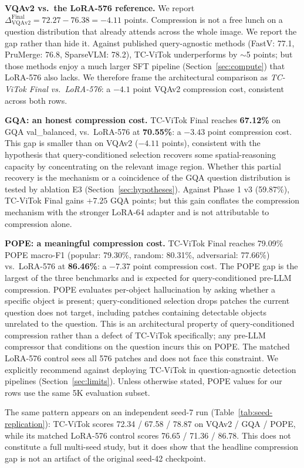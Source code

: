 \documentclass{article}
\begin{document}
\textbf{VQAv2 vs.\ the LoRA-576 reference.}
We report
$\Delta_\text{VQAv2}^{\text{Final}} = 72.27 - 76.38 = -4.11$ points.
Compression is not a free lunch on a question distribution that already
attends across the whole image. We report the gap rather than hide it.
Against published query-agnostic methods (FastV: 77.1, PruMerge: 76.8,
SparseVLM: 78.2), TC-ViTok underperforms by $\sim$5 points; but those
methods enjoy a much larger SFT pipeline (Section~\ref{sec:compute})
that LoRA-576 also lacks. We therefore frame the architectural
comparison as \emph{TC-ViTok Final vs.\ LoRA-576}: a $-4.1$ point
VQAv2 compression cost, consistent across both rows.

\textbf{GQA: an honest compression cost.}
TC-ViTok Final reaches \textbf{67.12\%} on GQA val\_balanced, vs.\
LoRA-576 at \textbf{70.55\%}: a $-3.43$ point compression cost.
This gap is smaller than on VQAv2 ($-4.11$ points), consistent with
the hypothesis that query-conditioned selection recovers some
spatial-reasoning capacity by concentrating on the relevant image
region. Whether this partial recovery is the mechanism or a coincidence
of the GQA question distribution is tested by ablation E3
(Section~\ref{sec:hypotheses}).
Against Phase 1 v3 (59.87\%), TC-ViTok Final gains $+7.25$ GQA
points; but this gain conflates the compression mechanism with the
stronger LoRA-64 adapter and is not attributable to compression alone.

\textbf{POPE: a meaningful compression cost.}
TC-ViTok Final reaches 79.09\% POPE macro-F1
(popular: 79.30\%, random: 80.31\%, adversarial: 77.66\%) vs.\
LoRA-576 at \textbf{86.46\%}: a $-7.37$ point compression cost.
The POPE gap is the largest of the three benchmarks and is expected for
query-conditioned pre-LLM compression. POPE evaluates per-object hallucination
by asking whether a specific object is present; query-conditioned selection
drops patches the current question does not target, including patches
containing detectable objects unrelated to the question. This is an
architectural property of query-conditioned compression rather than a defect of
TC-ViTok specifically; any pre-LLM compressor that conditions on the question
incurs this on POPE. The matched LoRA-576 control sees all 576 patches and does
not face this constraint. We explicitly recommend against deploying TC-ViTok in
question-agnostic detection pipelines (Section~\ref{sec:limits}). Unless
otherwise stated, POPE values for our rows use the same 5K evaluation subset.

The same pattern appears on an independent seed-7 run
(Table~\ref{tab:seed-replication}): TC-ViTok scores 72.34 / 67.58 / 78.87 on
VQAv2 / GQA / POPE, while its matched LoRA-576 control scores
76.65 / 71.36 / 86.78. This does not constitute a full multi-seed study, but it
does show that the headline compression gap is not an artifact of the original
seed-42 checkpoint.
\end{document}

